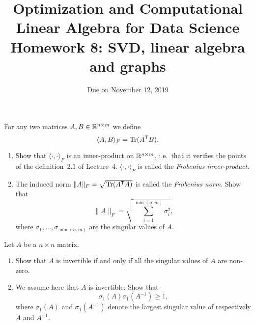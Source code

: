 \documentclass[11pt,nocut]{article}
\title{\vspace{-2.0cm}%
	Optimization and Computational Linear Algebra for Data Science\\
Homework 8: SVD, linear algebra and graphs}
\date{\vspace{-1cm}Due on November 12, 2019}
\begin{document}
\maketitle




\begin{problem}[2 points]
	For any two matrices $A,B \in \mathbb{R}^{n\times m}$ we define
	$$
	\langle A,B \rangle_{F} = {{\rm Tr}}(A^{{\sf T}} B).
	$$
	\begin{enumerate}[label=\normalfont(\textbf{\alph*})]
	\item Show that $\langle \cdot, \cdot \rangle_F$ is an inner-product on $\mathbb{R}^{n \times m}$, i.e.\ that it verifies the points of the definition~2.1 of Lecture~4. $\langle \cdot, \cdot \rangle_F$ is called the \emph{Frobenius inner-product}.
		\item The induced norm $\|A\|_F = \sqrt{{{\rm Tr}}(A^{{\sf T}} A)}$ is called the \emph{Frobenius norm}.
			Show that
			$$
			\|A\|_F = \sqrt{\sum_{i=1}^{\min(n,m)} \sigma_i^2},
			$$
			where $\sigma_1, \dots, \sigma_{\min(n,m)}$ are the singular values of $A$.
	\end{enumerate}
\end{problem}

\vspace{1mm}

\begin{problem}[2 points]
	Let $A$ be a $n \times n$ matrix.
	\begin{enumerate}[label=\normalfont(\textbf{\alph*})]
		\item Show that $A$ is invertible if and only if all the singular values of $A$ are non-zero.
		\item We assume here that $A$ is invertible. Show that 
				$$
				\sigma_1(A) \sigma_1(A^{-1}) \geq 1,
				$$
				where $\sigma_1(A)$ and $\sigma_1(A^{-1})$ denote the largest singular value of respectively $A$ and $A^{-1}$.
	\end{enumerate}
\end{problem}

\vspace{1mm}
\end{document}
